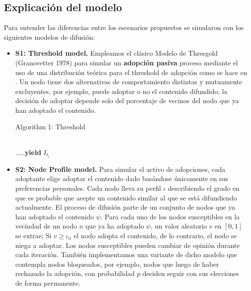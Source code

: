 \documentclass{article}
\begin{document}
\subsection{Explicación del modelo}
Para entender las diferencias entre los escenarios propuestos se simularon con los siguientes modelos de difusión:
\begin{itemize}
 \item \textbf{S1: Threshold model.} Empleamos el clásico Modelo de Thresgold (Granovetter 1978) para simular un \textbf{adopción pasiva} proceso mediante el uso de una distribución teórica para el threshold de adopción como se hace en \cite[Watts 2002]{watts:2002}. Un nodo tiene dos alternativas de comportamiento distintas y mutuamente excluyentes, por ejemplo, puede adoptar o no el contenido difundido, la decisión de adoptar depende solo del porcentaje de vecinos del nodo que ya han adoptado el contenido.
 
  
 \begin{algorithm} 
 	\caption{Algorithm 1: Threshold}
 	\begin{algorithmic}[1]	
 			\EndIf
 			\EndIf
	\\ \textbf{$.....$yield} $I_{t_i}$
	 \EndFor
	 \EndFor			
 	\end{algorithmic}
 \end{algorithm}
 
 \item \textbf{S2: Node Profile model.}
Para simular el activo de adopciones, cada adoptante elige adoptar el contenido dado basándose únicamente en sus preferencias personales. Cada nodo lleva su perfil $\iota$ describiendo el grado en que es probable que acepte un contenido similar al que se está difundiendo actualmente. El proceso de difusión parte de un conjunto de nodos que ya han adoptado el contenido $\psi$. Para cada uno de los nodos susceptibles en la vecindad de un nodo $n$ que ya ha adoptado $\psi$, un valor aleatorio $v$ en $[0,1]$ se extrae; Si $v \geq \iota_n$ el nodo adopta el contenido, de lo contrario, el nodo se niega a adoptar. Los nodos susceptibles pueden cambiar de opinión durante cada iteración. También implementamos una variante de dicho modelo que contempla nodos bloqueados, por ejemplo, nodos que luego de haber rechazado la adopción, con probabilidad $p$ deciden seguir con sus elecciones de forma permanente. 


\end{itemize}
\end{document}
